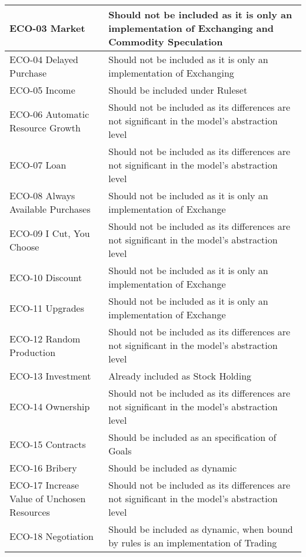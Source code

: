 \begin{longtable}{|m{7cm}|m{7cm}|}
        \hline
        ECO-03 Market & Should not be included as it is only an implementation of Exchanging and Commodity Speculation \\
        \hline
        ECO-04 Delayed Purchase & Should not be included as it is only an implementation of Exchanging\\
        \hline
        ECO-05 Income & Should be included under Ruleset \\
        \hline
        ECO-06 Automatic Resource Growth & Should not be included as its differences are not significant in the model's abstraction level\\
        \hline
        ECO-07 Loan & Should not be included as its differences are not significant in the model's abstraction level \\
        \hline
        ECO-08 Always Available Purchases & Should not be included as it is only an implementation of Exchange \\
        \hline
        ECO-09 I Cut, You Choose & Should not be included as its differences are not significant in the model's abstraction level\\
        \hline
        ECO-10 Discount & Should not be included as it is only an implementation of Exchange \\
        \hline
        ECO-11 Upgrades & Should not be included as it is only an implementation of Exchange \\
        \hline
        ECO-12 Random Production & Should not be included as its differences are not significant in the model's abstraction level \\
        \hline
        ECO-13 Investment & Already included as Stock Holding \\
        \hline
        ECO-14 Ownership & Should not be included as its differences are not significant in the model's abstraction level\\
        \hline
        ECO-15 Contracts & Should be included as an specification of Goals \\
        \hline
        ECO-16 Bribery & Should be included as dynamic \\
        \hline
        ECO-17 Increase Value of Unchosen Resources & Should not be included as its differences are not significant in the model's abstraction level\\
        \hline
        ECO-18 Negotiation & Should be included as dynamic, when bound by rules is an implementation of Trading \\
        \hline

\end{longtable}
